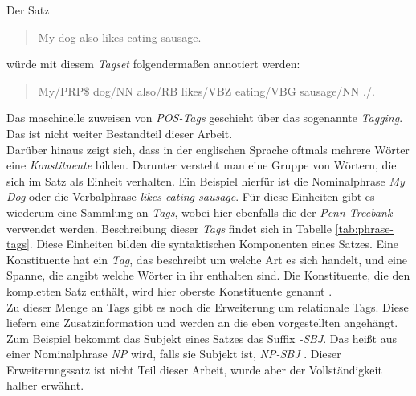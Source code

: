 Der Satz
\begin{quote}
My dog also likes eating sausage.
\end{quote}
würde mit diesem \textit{Tagset} folgendermaßen annotiert werden:
\begin{quote}
My/PRP\$ dog/NN also/RB likes/VBZ eating/VBG sausage/NN ./.
\end{quote}
Das maschinelle zuweisen von \textit{POS-Tags} geschieht über das sogenannte \textit{Tagging}. Das ist nicht weiter Bestandteil dieser Arbeit. \\
Darüber hinaus zeigt sich, dass in der englischen Sprache oftmals mehrere Wörter eine \textit{Konstituente} bilden. Darunter versteht man eine Gruppe von Wörtern, die sich im Satz als Einheit verhalten. Ein Beispiel hierfür ist die Nominalphrase \textit{My Dog} oder die Verbalphrase \textit{likes eating sausage}. Für diese Einheiten gibt es wiederum eine Sammlung an \textit{Tags}, wobei hier ebenfalls die der \textit{Penn-Treebank} verwendet werden. Beschreibung dieser \textit{Tags} findet sich in Tabelle \ref{tab:phrase-tags}. Diese Einheiten bilden die syntaktischen Komponenten eines Satzes. Eine Konstituente hat ein \textit{Tag}, das beschreibt um welche Art es sich handelt, und eine Spanne, die angibt welche Wörter in ihr enthalten sind. Die Konstituente, die den kompletten Satz enthält, wird hier oberste Konstituente genannt \cite[Kapitel 10]{nlpGrundlagen}. %
\\Zu dieser Menge an Tags gibt es noch die Erweiterung um relationale Tags. Diese liefern eine Zusatzinformation und werden an die eben vorgestellten angehängt. Zum Beispiel bekommt das Subjekt eines Satzes das Suffix \textit{-SBJ}. Das heißt aus einer Nominalphrase \textit{NP} wird, falls sie Subjekt ist, \textit{NP-SBJ} \cite{relationaltags}. Dieser Erweiterungssatz ist nicht Teil dieser Arbeit, wurde aber der Vollständigkeit halber erwähnt.
